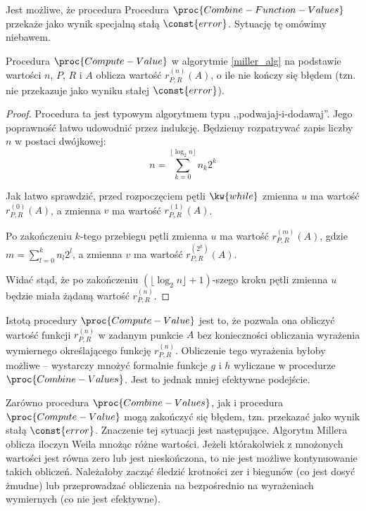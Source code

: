 \begin{remark}
Jest możliwe, że procedura Procedura $\proc{Combine-Function-Values}$
przekaże jako wynik specjalną stałą $\const{error}$.
Sytuację tę omówimy niebawem.
\end{remark}

\begin{lemma}\label{compute_value_correct_lemma}
Procedura $\proc{Compute-Value}$ w algorytmie \ref{miller_alg}
na podstawie wartości
$n$, $P$, $R$ i $A$
oblicza
wartość $r_{P,R}^{(n)}(A)$,
o ile nie kończy się błędem
(tzn. nie przekazuje jako wyniku stałej $\const{error}$).
\end{lemma}

\begin{proof}
Procedura ta jest typowym algorytmem typu ,,podwajaj-i-dodawaj''.
Jego poprawność łatwo udowodnić przez indukcję.
Będziemy rozpatrywać zapis liczby $n$ w postaci dwójkowej:
\begin{equation*}
n = \sum_{k = 0}^{\lfloor\log_2 n\rfloor} n_k2^k
\end{equation*}

\noindent
Jak łatwo sprawdzić,
przed rozpoczęciem pętli $\kw{while}$
zmienna $u$ ma wartość $r_{P,R}^{(0)}(A)$,
a zmienna $v$ ma wartość $r_{P,R}^{(1)}(A)$.

\noindent
Po zakończeniu $k$-tego przebiegu pętli
zmienna $u$ ma wartość $r_{P,R}^{(m)}(A)$,
gdzie $m = \sum_{l=0}^k n_l2^l$,
a zmienna $v$ ma wartość $r_{P,R}^{(2^k)}(A)$.

\noindent
Widać stąd, że po zakończeniu $(\lfloor\log_2 n\rfloor+1)$-szego kroku pętli
zmienna $u$ będzie miała żądaną wartość $r_{P,R}^{(n)}$.
\end{proof}

\begin{remark}
Istotą procedury $\proc{Compute-Value}$ jest to,
że pozwala ona obliczyć wartość funkcji $r_{P,R}^{(n)}$ w zadanym punkcie $A$
bez konieczności obliczania wyrażenia wymiernego
określającego funkcję $r_{P,R}^{(n)}$.
Obliczenie tego wyrażenia byłoby możliwe --
wystarczy mnożyć formalnie funkcje $g$ i $h$
wyliczane w procedurze $\proc{Combine-Values}$.
Jest to jednak mniej efektywne podejście.
\end{remark}

\begin{remark}
Zarówno procedura $\proc{Combine-Values}$,
jak i procedura $\proc{Compute-Value}$
mogą zakończyć się błędem, tzn. przekazać jako wynik stałą $\const{error}$.
Znaczenie tej sytuacji jest następujące.
Algorytm Millera oblicza iloczyn Weila mnożąc różne wartości.
Jeżeli którakolwiek z mnożonych wartości jest równa zero lub jest nieskończona,
to nie jest możliwe kontynuowanie takich obliczeń.
Należałoby zacząć śledzić krotności zer i biegunów
(co jest dosyć żmudne)
lub przeprowadzać obliczenia na bezpośrednio na wyrażeniach wymiernych
(co nie jest efektywne).
\end{remark}

